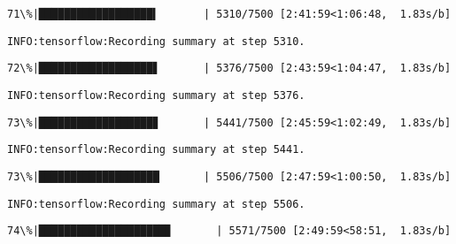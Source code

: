 \documentclass[11pt]{article}
\begin{document}
    \begin{Verbatim}[commandchars=\\\{\}]
 71\%|██████████████████▍       | 5310/7500 [2:41:59<1:06:48,  1.83s/b]
    \end{Verbatim}

    \begin{Verbatim}[commandchars=\\\{\}]
INFO:tensorflow:Recording summary at step 5310.

    \end{Verbatim}

    \begin{Verbatim}[commandchars=\\\{\}]
 72\%|██████████████████▋       | 5376/7500 [2:43:59<1:04:47,  1.83s/b]
    \end{Verbatim}

    \begin{Verbatim}[commandchars=\\\{\}]
INFO:tensorflow:Recording summary at step 5376.

    \end{Verbatim}

    \begin{Verbatim}[commandchars=\\\{\}]
 73\%|██████████████████▊       | 5441/7500 [2:45:59<1:02:49,  1.83s/b]
    \end{Verbatim}

    \begin{Verbatim}[commandchars=\\\{\}]
INFO:tensorflow:Recording summary at step 5441.

    \end{Verbatim}

    \begin{Verbatim}[commandchars=\\\{\}]
 73\%|███████████████████       | 5506/7500 [2:47:59<1:00:50,  1.83s/b]
    \end{Verbatim}

    \begin{Verbatim}[commandchars=\\\{\}]
INFO:tensorflow:Recording summary at step 5506.

    \end{Verbatim}

    \begin{Verbatim}[commandchars=\\\{\}]
 74\%|████████████████████▊       | 5571/7500 [2:49:59<58:51,  1.83s/b]
    \end{Verbatim}
\end{document}
